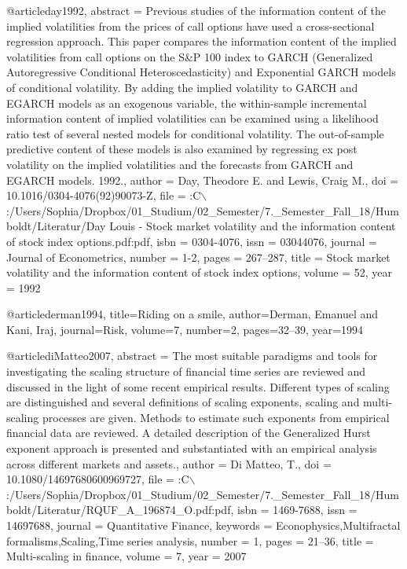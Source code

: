 @article{day1992,
abstract = {Previous studies of the information content of the implied volatilities from the prices of call options have used a cross-sectional regression approach. This paper compares the information content of the implied volatilities from call options on the S{\&}P 100 index to GARCH (Generalized Autoregressive Conditional Heteroscedasticity) and Exponential GARCH models of conditional volatility. By adding the implied volatility to GARCH and EGARCH models as an exogenous variable, the within-sample incremental information content of implied volatilities can be examined using a likelihood ratio test of several nested models for conditional volatility. The out-of-sample predictive content of these models is also examined by regressing ex post volatility on the implied volatilities and the forecasts from GARCH and EGARCH models. {\textcopyright} 1992.},
author = {Day, Theodore E. and Lewis, Craig M.},
doi = {10.1016/0304-4076(92)90073-Z},
file = {:C$\backslash$:/Users/Sophia/Dropbox/01{\_}Studium/02{\_}Semester/7.{\_}Semester{\_}Fall{\_}18/Humboldt/Literatur/Day Louis - Stock market volatility and the information content of stock index options.pdf:pdf},
isbn = {0304-4076},
issn = {03044076},
journal = {Journal of Econometrics},
number = {1-2},
pages = {267--287},
title = {{Stock market volatility and the information content of stock index options}},
volume = {52},
year = {1992}
}

@article{derman1994,
  title={Riding on a smile},
  author={Derman, Emanuel and Kani, Iraj},
  journal={Risk},
  volume={7},
  number={2},
  pages={32--39},
  year={1994}
}

@article{diMatteo2007,
abstract = {The most suitable paradigms and tools for investigating the scaling structure of financial time series are reviewed and discussed in the light of some recent empirical results. Different types of scaling are distinguished and several definitions of scaling exponents, scaling and multi-scaling processes are given. Methods to estimate such exponents from empirical financial data are reviewed. A detailed description of the Generalized Hurst exponent approach is presented and substantiated with an empirical analysis across different markets and assets.},
author = {{Di Matteo}, T.},
doi = {10.1080/14697680600969727},
file = {:C$\backslash$:/Users/Sophia/Dropbox/01{\_}Studium/02{\_}Semester/7.{\_}Semester{\_}Fall{\_}18/Humboldt/Literatur/RQUF{\_}A{\_}196874{\_}O.pdf:pdf},
isbn = {1469-7688},
issn = {14697688},
journal = {Quantitative Finance},
keywords = {Econophysics,Multifractal formalisms,Scaling,Time series analysis},
number = {1},
pages = {21--36},
title = {{Multi-scaling in finance}},
volume = {7},
year = {2007}
}

